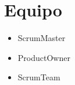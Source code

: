 \chapter{Equipo}

\begin{itemize}
\item ScrumMaster
\item ProductOwner
\item ScrumTeam
\end{itemize}